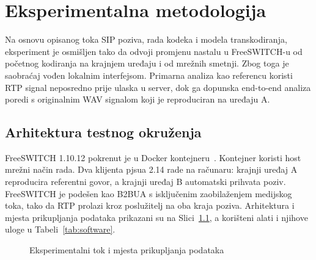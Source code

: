 \chapter{Eksperimentalna metodologija}
\label{ch:eksperiment}

Na osnovu opisanog toka SIP poziva, rada kodeka i modela transkodiranja, eksperiment je osmišljen tako da odvoji promjenu nastalu u FreeSWITCH-u od početnog kodiranja na krajnjem uređaju i od mrežnih smetnji. Zbog toga je saobraćaj vođen lokalnim interfejsom. Primarna analiza kao referencu koristi RTP signal neposredno prije ulaska u server, dok ga dopunska end-to-end analiza poredi s originalnim WAV signalom koji je reproduciran na uređaju A.

\section{Arhitektura testnog okruženja}

FreeSWITCH 1.10.12 pokrenut je u Docker kontejneru~\cite{freeswitch}. Kontejner koristi host mrežni način rada. Dva klijenta pjsua 2.14 rade na računaru: krajnji uređaj A reproducira referentni govor, a krajnji uređaj B automatski prihvata poziv. FreeSWITCH je podešen kao B2BUA s isključenim zaobilaženjem medijskog toka, tako da RTP prolazi kroz poslužitelj na oba kraja poziva. Arhitektura i mjesta prikupljanja podataka prikazani su na Slici~\ref{fig:testbed-flow}, a korišteni alati i njihove uloge u Tabeli~\ref{tab:software}.

\begin{figure}[htbp]
\centering
{}
\caption{Eksperimentalni tok i mjesta prikupljanja podataka}
\label{fig:testbed-flow}
\end{figure}

